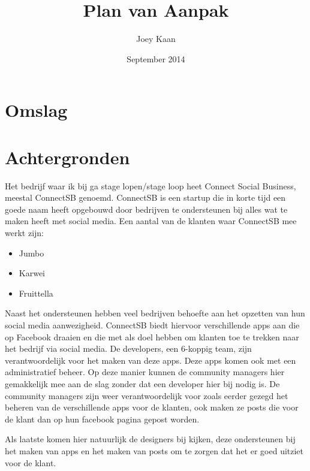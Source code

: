 \documentclass{article}
\title{Plan van Aanpak}
\author{Joey Kaan}
\date{September 2014}
\begin{document}
\section{Omslag}
\thispagestyle{empty}
\clearpage

\maketitle
\thispagestyle{empty}
\clearpage

\tableofcontents
\thispagestyle{empty}
\clearpage

\section{Achtergronden}
Het bedrijf waar ik bij ga stage lopen/stage loop heet Connect Social Business, meestal ConnectSB genoemd. ConnectSB is een startup die in korte tijd een goede naam heeft opgebouwd door bedrijven te ondersteunen bij alles wat te maken heeft met social media. Een aantal van de klanten waar ConnectSB mee werkt zijn:
\begin{itemize}
\item Jumbo
\item Karwei
\item Fruittella
\end{itemize}
Naast het ondersteunen hebben veel bedrijven behoefte aan het opzetten van hun social media aanwezigheid. ConnectSB biedt hiervoor verschillende apps aan die op Facebook draaien en die met als doel hebben om klanten toe te trekken naar het bedrijf via social media. De developers, een 6-koppig team, zijn verantwoordelijk voor het maken van deze apps. Deze apps komen ook met een administratief beheer. Op deze manier kunnen de community managers hier gemakkelijk mee aan de slag zonder dat een developer hier bij nodig is. De community managers zijn weer verantwoordelijk voor zoals eerder gezegd het beheren van de verschillende apps voor de klanten, ook maken ze posts die voor de klant dan op hun facebook pagina gepost worden.

Als laatste komen hier natuurlijk de designers bij kijken, deze ondersteunen bij het maken van apps en het maken van posts om te zorgen dat het er goed uitziet voor de klant.
\end{document}
